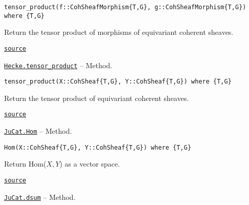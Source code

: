 \documentclass{memoir}
\begin{document}
\begin{adjustwidth}{2em}{0pt}


\begin{verbatim}
tensor_product(f::CohSheafMorphism{T,G}, g::CohSheafMorphism{T,G}) where {T,G}
\end{verbatim}

Return the tensor product of morphisms of equivariant coherent sheaves.



\href{https://github.com/FabianMaeurer/JuCat.jl/blob/367390e2d003deec2ababa73caeab405e934bb35/src/structures/ConvolutionCategory/CoherentSheaves.jl#L183-L187}{\texttt{source}}


\end{adjustwidth}
\hypertarget{18361793401985725179}{} 
\hyperlink{18361793401985725179}{\texttt{Hecke.tensor\_product}}  -- {Method.}

\begin{adjustwidth}{2em}{0pt}


\begin{verbatim}
tensor_product(X::CohSheaf{T,G}, Y::CohSheaf{T,G}) where {T,G}
\end{verbatim}

Return the tensor product of equivariant coherent sheaves.



\href{https://github.com/FabianMaeurer/JuCat.jl/blob/367390e2d003deec2ababa73caeab405e934bb35/src/structures/ConvolutionCategory/CoherentSheaves.jl#L173-L177}{\texttt{source}}


\end{adjustwidth}
\hypertarget{6888745570346083153}{} 
\hyperlink{6888745570346083153}{\texttt{JuCat.Hom}}  -- {Method.}

\begin{adjustwidth}{2em}{0pt}


\begin{verbatim}
Hom(X::CohSheaf{T,G}, Y::CohSheaf{T,G}) where {T,G}
\end{verbatim}

Return Hom(\(X,Y\)) as a vector space.



\href{https://github.com/FabianMaeurer/JuCat.jl/blob/367390e2d003deec2ababa73caeab405e934bb35/src/structures/ConvolutionCategory/CoherentSheaves.jl#L278-L282}{\texttt{source}}


\end{adjustwidth}
\hypertarget{13720751386988287155}{} 
\hyperlink{13720751386988287155}{\texttt{JuCat.dsum}}  -- {Method.}
\end{document}
